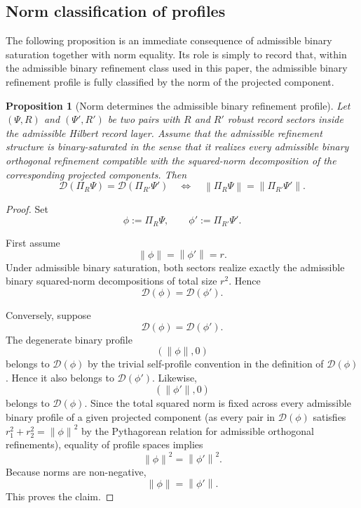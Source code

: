 \documentclass[11pt]{article}
\newtheorem{proposition}{Proposition}
\theoremstyle{remark}
\numberwithin{equation}{section}
\newcommand{\Proj}[1]{\Pi_{#1}}
\newcommand{\norm}[1]{\left\lVert #1 \right\rVert}
\begin{document}
\subsection{Norm classification of profiles}

The following proposition is an immediate consequence of admissible
binary saturation together with norm equality. Its role is simply to
record that, within the admissible binary refinement class used in this
paper, the admissible binary refinement profile is fully classified by
the norm of the projected component.

\begin{proposition}[Norm determines the admissible binary refinement profile]
\label{prop:norm-determines-profile}
Let $(\Psi,R)$ and $(\Psi',R')$ be two pairs with $R$ and $R'$ robust record sectors inside the admissible Hilbert record layer. Assume that the admissible refinement structure is binary-saturated in the sense that it realizes every admissible binary orthogonal refinement compatible with the squared-norm decomposition of the corresponding projected components. Then
\[
\mathcal{D}(\Proj{R}\Psi) = \mathcal{D}(\Proj{R'}\Psi')
\quad \Longleftrightarrow \quad
\norm{\Proj{R}\Psi} = \norm{\Proj{R'}\Psi'}.
\]
\end{proposition}

\begin{proof}
Set
\[
\phi := \Proj{R}\Psi,
\qquad
\phi' := \Proj{R'}\Psi'.
\]

First assume
\[
\norm{\phi} = \norm{\phi'} = r.
\]
Under admissible binary saturation, both sectors realize exactly the
admissible binary squared-norm decompositions of total size $r^2$.
Hence
\[
\mathcal{D}(\phi) = \mathcal{D}(\phi').
\]

Conversely, suppose
\[
\mathcal{D}(\phi) = \mathcal{D}(\phi').
\]
The degenerate binary profile
\[
(\norm{\phi},0)
\]
belongs to $\mathcal{D}(\phi)$ by the trivial self-profile convention in the definition of $\mathcal{D}(\phi)$. Hence it also belongs to $\mathcal{D}(\phi')$. Likewise,
\[
(\norm{\phi'},0)
\]
belongs to $\mathcal{D}(\phi)$.
Since the total squared norm is fixed across every admissible binary profile of a given projected component (as every pair in $\mathcal{D}(\phi)$ satisfies $r_1^2 + r_2^2 = \norm{\phi}^2$ by the Pythagorean relation for admissible orthogonal refinements), equality of profile spaces implies
\[
\norm{\phi}^2 = \norm{\phi'}^2.
\]
Because norms are non-negative,
\[
\norm{\phi} = \norm{\phi'}.
\]
This proves the claim.
\end{proof}
\end{document}
